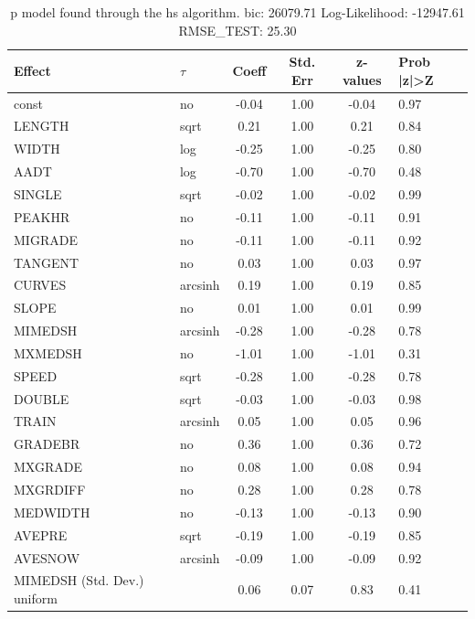 \begin{table}
	\caption{p model found through the hs algorithm. bic: 26079.71 Log-Likelihood: -12947.61 RMSE_TEST: 25.30}
	\begin{center}
		\begin{tabular}{|l|l|c|c|c|l|}
			\hline
			Effect & $\tau$ & Coeff & Std. Err & z-values & Prob |z|>Z \\
			\hline
			const & no & -0.04 & 1.00 & -0.04 & 0.97 \\
			\hline
			LENGTH & sqrt & 0.21 & 1.00 & 0.21 & 0.84 \\
			\hline
			WIDTH & log & -0.25 & 1.00 & -0.25 & 0.80 \\
			\hline
			AADT & log & -0.70 & 1.00 & -0.70 & 0.48 \\
			\hline
			SINGLE & sqrt & -0.02 & 1.00 & -0.02 & 0.99 \\
			\hline
			PEAKHR & no & -0.11 & 1.00 & -0.11 & 0.91 \\
			\hline
			MIGRADE & no & -0.11 & 1.00 & -0.11 & 0.92 \\
			\hline
			TANGENT & no & 0.03 & 1.00 & 0.03 & 0.97 \\
			\hline
			CURVES & arcsinh & 0.19 & 1.00 & 0.19 & 0.85 \\
			\hline
			SLOPE & no & 0.01 & 1.00 & 0.01 & 0.99 \\
			\hline
			MIMEDSH & arcsinh & -0.28 & 1.00 & -0.28 & 0.78 \\
			\hline
			MXMEDSH & no & -1.01 & 1.00 & -1.01 & 0.31 \\
			\hline
			SPEED & sqrt & -0.28 & 1.00 & -0.28 & 0.78 \\
			\hline
			DOUBLE & sqrt & -0.03 & 1.00 & -0.03 & 0.98 \\
			\hline
			TRAIN & arcsinh & 0.05 & 1.00 & 0.05 & 0.96 \\
			\hline
			GRADEBR & no & 0.36 & 1.00 & 0.36 & 0.72 \\
			\hline
			MXGRADE & no & 0.08 & 1.00 & 0.08 & 0.94 \\
			\hline
			MXGRDIFF & no & 0.28 & 1.00 & 0.28 & 0.78 \\
			\hline
			MEDWIDTH & no & -0.13 & 1.00 & -0.13 & 0.90 \\
			\hline
			AVEPRE & sqrt & -0.19 & 1.00 & -0.19 & 0.85 \\
			\hline
			AVESNOW & arcsinh & -0.09 & 1.00 & -0.09 & 0.92 \\
			\hline
			MIMEDSH (Std. Dev.) uniform &  & 0.06 & 0.07 & 0.83 & 0.41 \\
			\hline

\end{tabular}
\end{center}
\end{table}
